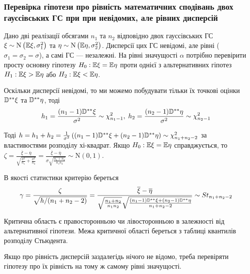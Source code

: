 \subsubsection*{Перевірка гіпотези про рівність математичних сподівань двох 
гауссівських ГС при при невідомих, але рівних дисперсій}

Дано дві реалізації обсягами $n_1$ та $n_2$ відповідно двох гауссівських ГС
$\xi \sim \mathrm{N}\left(\mathbb{E} \xi, \sigma_1^2\right)$ та $\eta \sim \mathrm{N}\left(\mathbb{E} \eta, \sigma_2^2\right)$.
Дисперсії цих ГС невідомі, але рівні ($\sigma_1 = \sigma_2 = \sigma$), а самі ГС --- незалежні. На рівні значущості $\alpha$ потрібно перевірити 
просту основну гіпотезу $H_0 : \mathbb{E} \xi = \mathbb{E} \eta$ проти однієї з альтернативних 
гіпотез $H_1 : \mathbb{E} \xi > \mathbb{E} \eta$ або $H_2 : \mathbb{E} \xi < \mathbb{E} \eta$.

Оскільки дисперсії невідомі, то ми можемо побудувати тільки їх точкові оцінки $\mathbb{D}^{**}\xi$ та
$\mathbb{D}^{**}\eta$, тоді
$$h_1 = \frac{(n_1 - 1)\mathbb{D}^{**}\xi}{\sigma^2} \sim \chi^2_{n_1 - 1}, \; h_2 = \frac{(n_2 - 1)\mathbb{D}^{**}\eta}{\sigma^2} \sim \chi^2_{n_2 - 1}$$

Тоді $h = h_1 + h_2 = \frac{1}{\sigma^2}\left((n_1-1)\mathbb{D}^{**}\xi + (n_2-1)\mathbb{D}^{**}\eta\right) \sim \chi_{n_1 + n_2 - 2}^2$ за властивостями розподілу хі-квадрат.
Якщо $H_0: \mathbb{E}\xi = \mathbb{E}\eta$ справджується, то 
$\zeta = \frac{\overline{\xi} - \overline{\eta}}{\sqrt{\frac{\sigma^2}{n_1} + \frac{\sigma^2}{n_2}}} =
\frac{\overline{\xi} - \overline{\eta}}{\sigma\sqrt{\frac{n_1 + n_2}{n_1 n_2}}} \sim \mathrm{N}(0, 1)$.

В якості статистики критерію береться
$$\gamma = \frac{\zeta}{\sqrt{h/(n_1 + n_2 - 2)}} = 
\frac{\overline{\xi} - \overline{\eta}}
{\sqrt{\frac{n_1 + n_2}{n_1 n_2}}
\sqrt{\frac{(n_1 - 1)\mathbb{D}^{**}\xi + (n_2 - 1)\mathbb{D}^{**}\eta}{n_1 + n_2 - 2}}} 
\sim {St}_{n_1 + n_2 - 2}$$

Критична область є правосторонньою чи лівосторонньою в залежності від альтернативної гіпотези.
Межа критичної області береться з таблиці квантилів розподілу Стьюдента. 
\begin{remark}
    Якщо про рівність дисперсій заздалегідь нічого не відомо, треба перевіряти гіпотезу про їх рівність
    на тому ж самому рівні значущості.
\end{remark}

